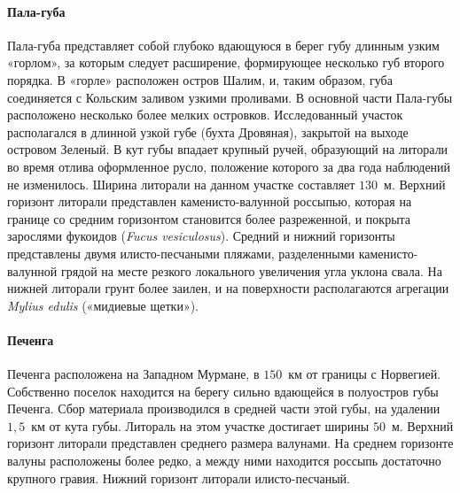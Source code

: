     \paragraph{Пала-губа}
Пала-губа   представляет   собой   глубоко   вдающуюся   в   берег   губу   длинным   узким «горлом», за которым следует расширение, формирующее несколько губ второго порядка. 
В «горле» расположен остров Шалим, и, таким образом, губа соединяется с Кольским заливом узкими   проливами.   
В   основной   части   Пала-губы   расположено   несколько   более   мелких островков. 
Исследованный участок располагался в длинной узкой губе (бухта Дровяная), закрытой на выходе островом Зеленый.
В кут губы впадает крупный ручей, образующий на литорали во время отлива оформленное русло, положение которого за два года наблюдений не изменилось.
Ширина литорали на данном участке составляет  $130$~м. 
Верхний горизонт литорали представлен   каменисто-валунной   россыпью,   которая   на   границе   со   средним   горизонтом становится более разреженной, и покрыта зарослями фукоидов ({\it Fucus vesiculosus}). 
Средний и нижний   горизонты   представлены   двумя   илисто-песчаными   пляжами,   разделенными каменисто-валунной грядой на месте резкого локального увеличения угла уклона свала. 
На нижней литорали грунт более заилен, и на поверхности располагаются агрегации {\it Mylius edulis} («мидиевые щетки»).

    \paragraph{Печенга}
Печенга расположена на Западном Мурмане, в $150$~км от границы с Норвегией. 
Собственно поселок находится на берегу сильно вдающейся в полуостров губы Печенга. 
Сбор материала производился в средней части этой губы, на удалении $1,5$~км от кута губы. 
Литораль на этом участке достигает ширины $50$~м. 
Верхний горизонт литорали представлен среднего размера валунами. 
На среднем горизонте валуны расположены более редко, а между ними находится россыпь достаточно крупного гравия. 
Нижний горизонт литорали илисто-песчаный. 

